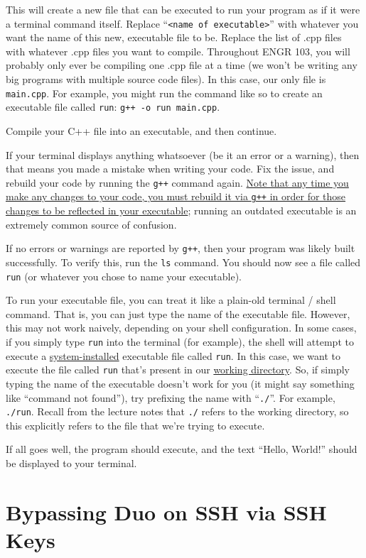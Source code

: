 \documentclass{article}
\begin{document}
This will create a new file that can be executed to run your program as if it were a terminal command itself. Replace ``\texttt{<name of executable>}'' with whatever you want the name of this new, executable file to be. Replace the list of .cpp files with whatever .cpp files you want to compile. Throughout ENGR 103, you will probably only ever be compiling one .cpp file at a time (we won't be writing any big programs with multiple source code files). In this case, our only file is \texttt{main.cpp}. For example, you might run the command like so to create an executable file called \texttt{run}: \texttt{g++ -o run main.cpp}.

Compile your C++ file into an executable, and then continue.

If your terminal displays anything whatsoever (be it an error or a warning), then that means you made a mistake when writing your code. Fix the issue, and rebuild your code by running the \texttt{g++} command again. \ul{Note that any time you make any changes to your code, you must rebuild it via \texttt{g++} in order for those changes to be reflected in your executable}; running an outdated executable is an extremely common source of confusion.

If no errors or warnings are reported by \texttt{g++}, then your program was likely built successfully. To verify this, run the \texttt{ls} command. You should now see a file called \texttt{run} (or whatever you chose to name your executable).

To run your executable file, you can treat it like a plain-old terminal / shell command. That is, you can just type the name of the executable file. However, this may not work naively, depending on your shell configuration. In some cases, if you simply type \texttt{run} into the terminal (for example), the shell will attempt to execute a \ul{system-installed} executable file called \texttt{run}. In this case, we want to execute the file called \texttt{run} that's present in our \ul{working directory}. So, if simply typing the name of the executable doesn't work for you (it might say something like ``command not found''), try prefixing the name with ``\texttt{./}''. For example, \texttt{./run}. Recall from the lecture notes that \texttt{./} refers to the working directory, so this explicitly refers to the file that we're trying to execute.

If all goes well, the program should execute, and the text ``Hello, World!'' should be displayed to your terminal.

\section{Bypassing Duo on SSH via SSH Keys}
\end{document}
